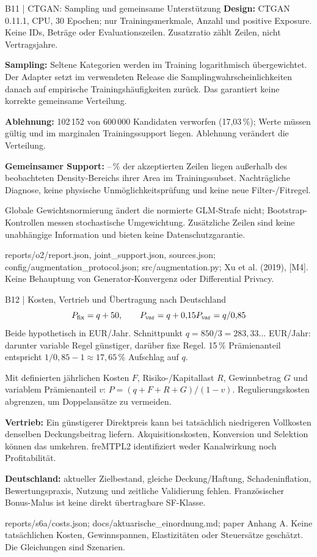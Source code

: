 \documentclass[aspectratio=169,11pt]{beamer}
\newcommand{\source}[1]{\vfill{\fontsize{6.5}{7.4}\selectfont\color{muted}#1\par}}
\newcommand{\smalltext}{\fontsize{9}{11.3}\selectfont}
\begin{document}
\begin{frame}[t]{B11 | CTGAN: Sampling und gemeinsame Unterstützung}
\smalltext
\textbf{Design:} CTGAN 0.11.1, CPU, 30 Epochen; nur Trainingsmerkmale,
Anzahl und positive Exposure. Keine IDs, Beträge oder Evaluationszeilen.
Zusatzratio zählt Zeilen, nicht Vertragsjahre.\par\medskip
\textbf{Sampling:} Seltene Kategorien werden im Training logarithmisch übergewichtet.
Der Adapter setzt im verwendeten Release die Samplingwahrscheinlichkeiten danach
auf empirische Trainingshäufigkeiten zurück. Das garantiert keine korrekte gemeinsame Verteilung.\par\medskip
\textbf{Ablehnung:} 102\,152 von 600\,000 Kandidaten verworfen (17,03\,\%);
Werte müssen gültig und im marginalen Trainingssupport liegen. Ablehnung verändert die Verteilung.\par\medskip
\textbf{Gemeinsamer Support:} \SupportMin--\SupportMax\,\% der akzeptierten Zeilen
liegen außerhalb des beobachteten Density-Bereichs ihrer Area im Trainingssubset.
Nachträgliche Diagnose, keine physische Unmöglichkeitsprüfung und keine neue Filter-/Fitregel.\par\medskip
Globale Gewichtsnormierung ändert die normierte GLM-Strafe nicht;
Bootstrap-Kontrollen messen stochastische Umgewichtung.
Zusätzliche Zeilen sind keine unabhängige Information und bieten keine Datenschutzgarantie.
\source{reports/o2/report.json, joint\_support.json, sources.json; config/augmentation\_protocol.json;
src/augmentation.py; Xu et al. (2019), [M4]. Keine Behauptung von Generator-Konvergenz oder Differential Privacy.}
\end{frame}

\begin{frame}[t]{B12 | Kosten, Vertrieb und Übertragung nach Deutschland}
\[
P_{\rm fix}=q+50,\qquad P_{\rm var}=q+0{,}15P_{\rm var}=q/0{,}85
\]
\smalltext Beide hypothetisch in EUR/Jahr. Schnittpunkt $q=850/3=283{,}33\ldots$ EUR/Jahr:
darunter variable Regel günstiger, darüber fixe Regel.
15\,\% Prämienanteil entspricht $1/0{,}85-1\approx17{,}65$\,\% Aufschlag auf $q$.\par\medskip
Mit definierten jährlichen Kosten $F$, Risiko-/Kapitallast $R$, Gewinnbetrag $G$
und variablem Prämienanteil $v$: $P=(q+F+R+G)/(1-v)$.
Regulierungskosten abgrenzen, um Doppelansätze zu vermeiden.\par\medskip
\textbf{Vertrieb:} Ein günstigerer Direktpreis kann bei tatsächlich niedrigeren Vollkosten denselben Deckungsbeitrag liefern.
Akquisitionskosten, Konversion und Selektion können das umkehren.
freMTPL2 identifiziert weder Kanalwirkung noch Profitabilität.\par\medskip
\textbf{Deutschland:} aktueller Zielbestand, gleiche Deckung/Haftung, Schadeninflation,
Bewertungspraxis, Nutzung und zeitliche Validierung fehlen.
Französischer Bonus-Malus ist keine direkt übertragbare SF-Klasse.
\source{reports/s6a/costs.json; docs/aktuarische\_einordnung.md; paper Anhang A.
Keine tatsächlichen Kosten, Gewinnspannen, Elastizitäten oder Steuersätze geschätzt. Die Gleichungen sind Szenarien.}
\end{frame}
\end{document}
